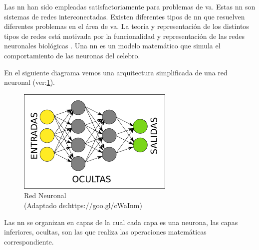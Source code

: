 Las \ac{nn} han sido empleadas satisfactoriamente para problemas de \ac{va}. Estas \ac{nn} son sistemas de redes interconectadas. Existen diferentes tipos de \ac{nn} que resuelven diferentes problemas en el área de \ac{va}. La teoría y representación de los distintos tipos de redes está motivada por la funcionalidad y representación de las redes neuronales biológicas \citep{bernd}. Una \ac{nn} es un modelo matemático que simula el comportamiento de las neuronas del celebro.

En el siguiente diagrama vemos una arquitectura simplificada de una red neuronal (ver:\ref{Fig: redneuronal}).
\begin{figure}[H]
 \centering
  \includegraphics[height=5cm,keepaspectratio=true,clip=true]{imagenes/Logos/neural-net1.png}
  \caption{Red Neuronal \\(Adaptado de:{https://goo.gl/cWaInm})}
	\label{Fig: redneuronal}
\end{figure}

Las \ac{nn} se organizan en capas de la cual cada capa es una neurona, las capas inferiores, ocultas, son las que realiza las operaciones matemáticas correspondiente.  

